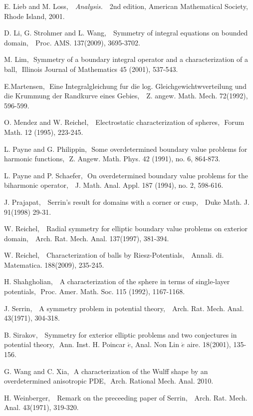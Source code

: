 \documentclass[12pt]{amsproc}
\theoremstyle{plain}
\numberwithin{equation}{section}
\begin{document}
\begin{thebibliography}{CL}
 E. Lieb and M. Loss, \,\, {\em Analysis.} \,\, 2nd edition, American
Mathematical Society, Rhode Island, 2001.

 D. Li, G. Strohmer and L. Wang, \,\, Symmetry of
integral equations on bounded domain, \,\, Proc. AMS. 137(2009),
3695-3702.

 M. Lim, \,\,Symmetry of a boundary integral operator and a characterization of a ball, \,\,Illinois Journal of Mathematics 45 (2001), 537-543.

 E.Martensen,\,\, Eine Integralgleichung fur die log.
Gleichgewichtwverteilung und die Krummung der Randkurve eines
Gebies, \,\, Z. angew. Math. Mech. 72(1992), 596-599.

 O. Mendez and W. Reichel, \,\, Electrostatic characterization of spheres,\,\, Forum Math. 12 (1995), 223-245.

 L. Payne and G. Philippin,  \,\,Some overdetermined boundary value problems for harmonic functions, \,\,Z. Angew. Math. Phys. 42 (1991), no. 6, 864-873.

 L. Payne and  P. Schaefer, \,\,On overdetermined boundary value problems for the biharmonic operator, \,\, J. Math. Anal. Appl. 187 (1994), no. 2, 598-616.

 J. Prajapat, \,\, Serrin's result for domains with a corner or
cusp, \,\, Duke Math. J. 91(1998) 29-31.

 W. Reichel, \,\, Radial symmetry for elliptic boundary
value problems on exterior domain, \,\, Arch. Rat. Mech. Anal.
137(1997), 381-394.

 W. Reichel, \,\, Characterization of balls by
Riesz-Potentials, \,\, Annali. di. Matematica. 188(2009), 235-245.

 H. Shahgholian, \,\, A characterization of the sphere in terms of single-layer potentials, \,\,Proc. Amer. Math. Soc. 115 (1992), 1167-1168.

 J. Serrin, \,\, A symmetry problem in potential
theory, \,\, Arch. Rat. Mech. Anal. 43(1971), 304-318.

 B. Sirakov, \,\, Symmetry for exterior elliptic problems
and two conjectures in potential theory, \,\,Ann. Inst. H. Poincar
$\acute{e}$, Anal. Non Lin
 $\acute{e}$ aire. 18(2001), 135-156.

  G. Wang and C. Xia, \,\,A characterization of the Wulff shape by an overdetermined anisotropic PDE, \,\,Arch. Rational Mech. Anal. 2010.

 H. Weinberger, \,\, Remark on the preceeding paper of
Serrin, \,\, Arch. Rat. Mech. Anal. 43(1971), 319-320.

\end{thebibliography}
\end{document}
